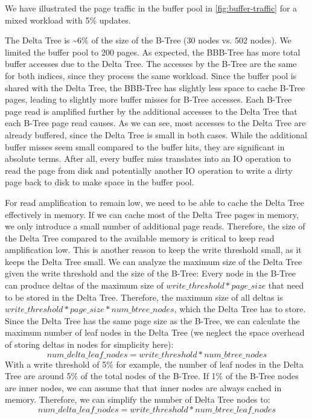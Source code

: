 We have illustrated the page traffic in the buffer pool in \autoref{fig:buffer-traffic} for a mixed workload with 5\% updates.

The Delta Tree is \textasciitilde6\% of the size of the B-Tree (30 nodes vs. 502 nodes).
We limited the buffer pool to 200 pages.
As expected, the BBB-Tree has more total buffer accesses due to the Delta Tree.
The accesses by the B-Tree are the same for both indices, since they process the same workload.
Since the buffer pool is shared with the Delta Tree, the BBB-Tree has slightly less space to cache B-Tree pages, leading to slightly more buffer misses for B-Tree accesses.
Each B-Tree page read is amplified further by the additional accesses to the Delta Tree that each B-Tree page read causes.
As we can see, most accesses to the Delta Tree are already buffered, since the Delta Tree is small in both cases.
While the additional buffer misses seem small compared to the buffer hits, they are significant in absolute terms.
After all, every buffer miss translates into an \ac{IO} operation to read the page from disk and potentially another \ac{IO} operation to write a dirty page back to disk to make space in the buffer pool.

For read amplification to remain low, we need to be able to cache the Delta Tree effectively in memory.
If we can cache most of the Delta Tree pages in memory, we only introduce a small number of additional page reads.
Therefore, the size of the Delta Tree compared to the available memory is critical to keep read amplification low.
This is another reason to keep the write threshold small, as it keeps the Delta Tree small.
We can analyze the maximum size of the Delta Tree given the write threshold and the size of the B-Tree:
Every node in the B-Tree can produce deltas of the maximum size of $write\_threshold * page\_size$ that need to be stored in the Delta Tree.
Therefore, the maximum size of all deltas is $write\_threshold * page\_size * num\_btree\_nodes$, which the Delta Tree has to store.
Since the Delta Tree has the same page size as the B-Tree, we can calculate the maximum number of leaf nodes in the Delta Tree (we neglect the space overhead of storing deltas in nodes for simplicity here):
$$num\_delta\_leaf\_nodes =  write\_threshold * num\_btree\_nodes$$
With a write threshold of 5\% for example, the number of leaf nodes in the Delta Tree are around 5\% of the total nodes of the B-Tree.
If 1\% of the B-Tree nodes are inner nodes, we can assume that that inner nodes are always cached in memory.
Therefore, we can simplify the number of Delta Tree nodes to:
$$num\_delta\_leaf\_nodes =  write\_threshold * num\_btree\_leaf\_nodes$$

